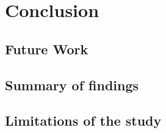\section{Conclusion}

\subsection{Future Work}

\subsection{Summary of findings}

\subsection{Limitations of the study}